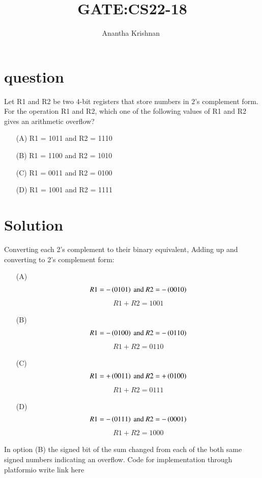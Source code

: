 \documentclass[journal,12pt,onecolumn]{IEEEtran}
\theoremstyle{remark}
\begin{document}

\vspace{3cm}

\title{GATE:CS22-18}
\author{Anantha Krishnan $^{}$%
}
\maketitle
\bigskip



\section{question}
Let R1 and R2 be two $4$-bit registers that store numbers in $2$'s complement form. For the operation R1 and R2, which one of the following values of R1 and R2 gives an arithmetic overflow?
\begin{enumerate}
    \item [(A)] R1 = 1011 and R2 = 1110
        \item [(B)] R1 = 1100 and R2 = 1010
    \item [(C)] R1 = 0011 and R2 = 0100
    \item [(D)] R1 = 1001 and R2 = 1111
\end{enumerate}
\section{Solution}
Converting each 2's complement to their binary equivalent, Adding up and converting to 2's complement form:

\begin{enumerate}
    \item [(A)]
    \begin{align}
R1 = -\left(0101\right) \text{ and } R2=-\left(0010\right)
\end{align}
\begin{align}
    R1 + R2 = 1001
\end{align}

    \item [(B)]
    \begin{align}
R1 = -\left(0100\right) \text{ and } R2=-\left(0110\right)
\end{align}
\begin{align}
    R1 + R2 = 0110
\end{align}

    \item [(C)]
    \begin{align}
R1 = +\left(0011\right) \text{ and } R2=+\left(0100\right)
\end{align}
\begin{align}
    R1 + R2 = 0111
\end{align}

    \item [(D)]
    \begin{align}
R1 = -\left(0111\right) \text{ and } R2=-\left(0001\right)
\end{align}
\begin{align}
    R1 + R2 = 1000
\end{align}
\end{enumerate}
In option (B) the signed bit of the sum changed from each of the both same signed numbers indicating an overflow.
Code for implementation through platformio
write link here
 
\end{document}
